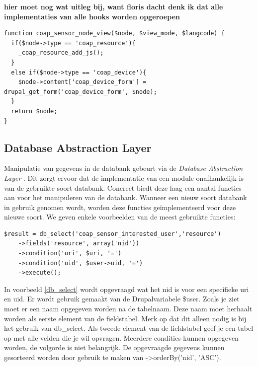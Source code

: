 \textbf{hier moet nog wat uitleg bij, want floris dacht denk ik dat alle implementaties van alle hooks worden opgeroepen}

\scriptsize
\lstset{language=PHP}
\begin{lstlisting}[label=lst:drupalHookExample,caption=Implementatie van hook\_node\_view door de module coap\_sensor]
function coap_sensor_node_view($node, $view_mode, $langcode) {
  if($node->type == 'coap_resource'){
    _coap_resource_add_js();
  }
  else if($node->type == 'coap_device'){
    $node->content['coap_device_form'] = drupal_get_form('coap_device_form', $node);
  }
  return $node;
}
\end{lstlisting}
\normalsize

\subsection{Database Abstraction Layer}\label{databaseAbstractionLayer}
Manipulatie van gegevens in de databank gebeurt via de \textit{Database Abstraction Layer} \cite{databaseAbstractionLayer}. Dit zorgt ervoor dat de implementatie van een module onafhankelijk is van de gebruikte soort databank. Concreet biedt deze laag een aantal functies aan voor het manipuleren van de databank. Wanneer een nieuw soort databank in gebruik genomen wordt, worden deze functies ge\"{i}mplementeerd voor deze nieuwe soort. We geven enkele voorbeelden van de meest gebruikte functies:
\lstset{language=PHP}
\begin{lstlisting}[label=db_select,caption=Voorbeeld gebruik van db\_select]
$result = db_select('coap_sensor_interested_user','resource')
	->fields('resource', array('nid'))
	->condition('uri', $uri, '=')
	->condition('uid', $user->uid, '=')
	->execute();
\end{lstlisting}
In voorbeeld \ref{db_select} wordt opgevraagd wat het nid is voor een specifieke uri en uid. Er wordt gebruik gemaakt van de Drupalvariabele \$user. Zoals je ziet moet er een naam opgegeven worden na de tabelnaam. Deze naam moet herhaalt worden als eerste element van de fieldstabel. Merk op dat dit alleen nodig is bij het gebruik van db\_select. Als tweede element van de fieldstabel geef je een tabel op met alle velden die je wil opvragen. Meerdere condities kunnen opgegeven worden, de volgorde is niet belangrijk. De opgevraagde gegevens kunnen gesorteerd worden door gebruik te maken van -\textgreater orderBy('nid', 'ASC').\\

